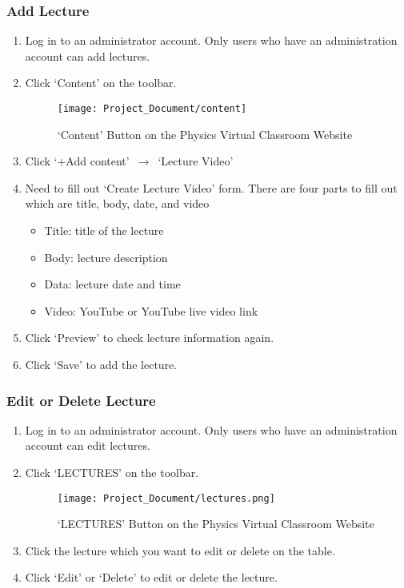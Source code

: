 \documentclass[10pt]{article}
\begin{document}
        \subsubsection{Add Lecture}
            \begin{enumerate}
            	\item Log in to an administrator account. Only users who have an administration account can add lectures.
            	\item Click `Content' on the toolbar.
            	   \begin{figure}[!ht]
            	        \centering
                        \texttt{[image: Project\_Document/content]}
                        \caption{`Content' Button on the Physics Virtual Classroom Website}
                    \end{figure}
            	\item Click `+Add content' $\,\to\,$ `Lecture Video'
            	\item Need to fill out `Create Lecture Video' form. There are four parts to fill out which are title, body, date, and video
            	    \begin{itemize}
                    	\item Title: title of the lecture
                    	\item Body: lecture description
                    	\item Data: lecture date and time
                    	\item Video: YouTube or YouTube live video link
                    \end{itemize}
            	\item Click `Preview' to check lecture information again.
            	\item Click `Save' to add the lecture.
            \end{enumerate}

        \subsubsection{Edit or Delete Lecture}
            \begin{enumerate}
            	\item Log in to an administrator account. Only users who have an administration account can edit lectures.

            	\item Click `LECTURES' on the toolbar.
            	    \begin{figure}[!ht]
            	        \centering
                        \texttt{[image: Project\_Document/lectures.png]}
                        \caption{`LECTURES' Button on the Physics Virtual Classroom Website}
                    \end{figure}
            	\item Click the lecture which you want to edit or delete on the table.
            	\item Click `Edit' or `Delete' to edit or delete the lecture.
            \end{enumerate}
\end{document}
